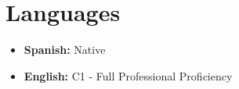 \documentclass[11pt,a4paper,sans]{moderncv}
\begin{document}
\section{Languages}
    \begin{minipage}{\linewidth}
        \begin{minipage}{0.5\linewidth}
            \begin{itemize}
                \item \textbf{Spanish:} Native
            \end{itemize}            
        \end{minipage}
        \begin{minipage}{0.5\linewidth}
            \begin{itemize}
                \item \textbf{English:} C1 - Full Professional Proficiency
            \end{itemize}            
        \end{minipage}
    \end{minipage}
\end{document}
